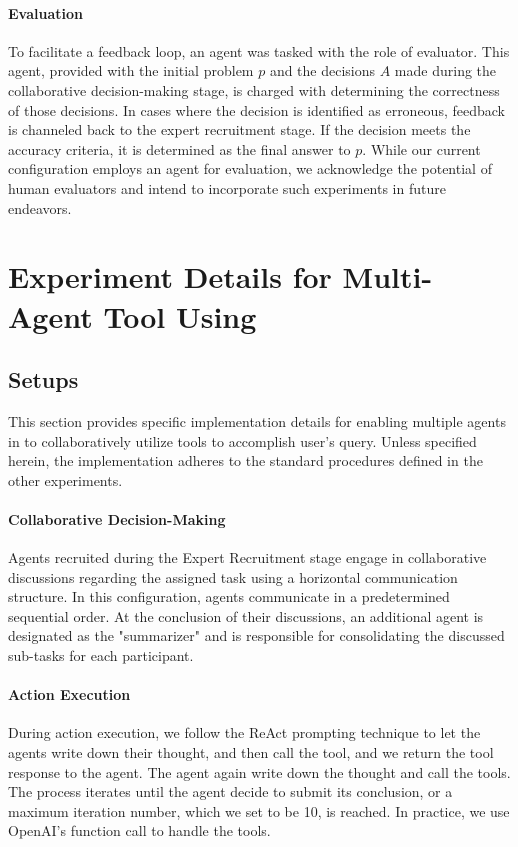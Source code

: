 \paragraph{Evaluation}
To facilitate a feedback loop, an agent was tasked with the role of evaluator. This agent, provided with the initial problem $p$ and the decisions $A$ made during the collaborative decision-making stage, is charged with determining the correctness of those decisions. In cases where the decision is identified as erroneous, feedback is channeled back to the expert recruitment stage. If the decision meets the accuracy criteria, it is determined as the final answer to $p$. While our current configuration employs an agent for evaluation, we acknowledge the potential of human evaluators and intend to incorporate such experiments in future endeavors.


\section{Experiment Details for Multi-Agent Tool Using}
\label{sec:appendix-tool-instruction}
\subsection{Setups}
This section provides specific implementation details for enabling multiple agents in \framework to collaboratively utilize tools to accomplish user's query. Unless specified herein, the implementation adheres to the standard procedures defined in the other experiments.

\paragraph{Collaborative Decision-Making}
Agents recruited during the Expert Recruitment stage engage in collaborative discussions regarding the assigned task using a horizontal communication structure. In this configuration, agents communicate in a predetermined sequential order. At the conclusion of their discussions, an additional agent is designated as the "summarizer" and is responsible for consolidating the discussed sub-tasks for each participant.

\paragraph{Action Execution}
During action execution, we follow the ReAct prompting technique to let the agents write down their thought, and then call the tool, and we return the tool response to the agent. The agent again write down the thought and call the tools. The process iterates until the agent decide to submit its conclusion, or a maximum iteration number, which we set to be 10, is reached. In practice, we use OpenAI's function call to handle the tools.

